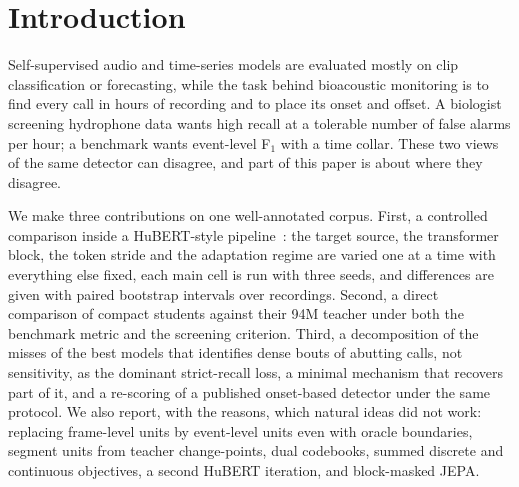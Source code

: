 \documentclass[10pt,twocolumn]{article}
\newcommand{\Fone}{F$_1$}
\begin{document}
\section{Introduction}
Self-supervised audio and time-series models are evaluated mostly on clip classification or forecasting, while the task behind bioacoustic monitoring is to find every call in hours of recording and to place its onset and offset. A biologist screening hydrophone data wants high recall at a tolerable number of false alarms per hour; a benchmark wants event-level \Fone{} with a time collar. These two views of the same detector can disagree, and part of this paper is about where they disagree.

We make three contributions on one well-annotated corpus. First, a controlled comparison inside a HuBERT-style pipeline~\citep{hsu2021hubert}: the target source, the transformer block, the token stride and the adaptation regime are varied one at a time with everything else fixed, each main cell is run with three seeds, and differences are given with paired bootstrap intervals over recordings. Second, a direct comparison of compact students against their 94M teacher under both the benchmark metric and the screening criterion. Third, a decomposition of the misses of the best models that identifies dense bouts of abutting calls, not sensitivity, as the dominant strict-recall loss, a minimal mechanism that recovers part of it, and a re-scoring of a published onset-based detector under the same protocol. We also report, with the reasons, which natural ideas did not work: replacing frame-level units by event-level units even with oracle boundaries, segment units from teacher change-points, dual codebooks, summed discrete and continuous objectives, a second HuBERT iteration, and block-masked JEPA.
\end{document}
